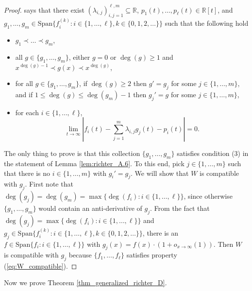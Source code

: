 \documentclass[12pt]{article}
\theoremstyle{plain} %
\theoremstyle{definition} %
\theoremstyle{plain}
\theoremstyle{plain}
\numberwithin{equation}{section}
\newcommand{\R}{\mathbb{R}}
\renewcommand{\leq}{\leqslant}
\renewcommand{\geq}{\geqslant}
\renewcommand{\subset}{\subseteq}
\newcommand{\1}{\mathbbm{1}}
\newcommand{\oo}{\infty}
\begin{document}
 \begin{proof}
     \cite[Lemma A.4]{Richter23} says that there exist $(\lambda_{i,j})_{i,j=1}^{\ell,m}\subset \R$, $p_1(t),\dots, p_{\ell}(t)\in \R[t]$, and $g_1,\dots, g_m \in \text{Span}\{f^{(k)}_i:i\in \{1,\dots, \ell\}, k\in \{0,1,2,\dots\}\}$ such that the following hold
     \begin{itemize}
         \item $g_1\prec \dots \prec g_m$,
         \item all $g\in \{g_1,\dots, g_m\}$, either $g=0$ or $\deg(g)\geq 1$ and $x^{\deg(g)-1}\prec g(x)\prec x^{\deg(g)}$,
         \item for all $g\in \{g_1,\dots, g_m\}$, if $\deg(g)\geq 2$ then $g' = g_j$ for some $j\in \{1,\dots, m\}$, and if $1\leq \deg(g)\leq \deg(g_m)-1$ then $g_j'=g$ for some $j\in\{1,\dots, m\}$,
         \item 
         for each $i\in \{1,\dots, \ell\}$,
    \begin{equation}\label{eq:A.6}
    \lim_{t\to\oo}\left|f_i(t)-\sum_{j=1}^m\lambda_{i,j}g_j(t)-p_i(t)\right|=0.
    \end{equation}
     \end{itemize}
     The only thing to prove is that this collection $\{g_1,\dots, g_m\}$ satisfies condition (3) in the statement of Lemma \ref{lem:richter_A.6}. To this end, pick $j\in \{1,\dots, m\}$ such that there is no $i\in \{1,\dots, m\}$ with $g_i'=g_j$. We will show that $W$ is compatible with $g_j$. First note that $\deg(g_j) = \deg(g_m) = \max\{\deg(f_i):i\in \{1,\dots, \ell\}\}$, since otherwise $\{g_1,\dots, g_m\}$ would contain an anti-derivative of $g_j$. From the fact that $\deg(g_j) =\max\{\deg(f_i):i\in \{1,\dots, \ell\}\}$ and $g_j\in \text{Span}\{f_i^{(k)}:i\in \{1,\dots, \ell\},k\in \{0,1,2,\dots\}\}$, there is an $f \in \text{Span}\{f_i:i\in \{1,\dots, \ell\}\} $ with $g_j(x) = f(x)\cdot (1+o_{x\to\oo}(1))$. Then $W$ is compatible with $g_j$ because $\{f_1,\dots, f_{\ell}\}$ satisfies property (\ref{eq:W_compatible}).
 \end{proof}

Now we prove Theorem \ref{thm_generalized_richter_D}.
\end{document}
